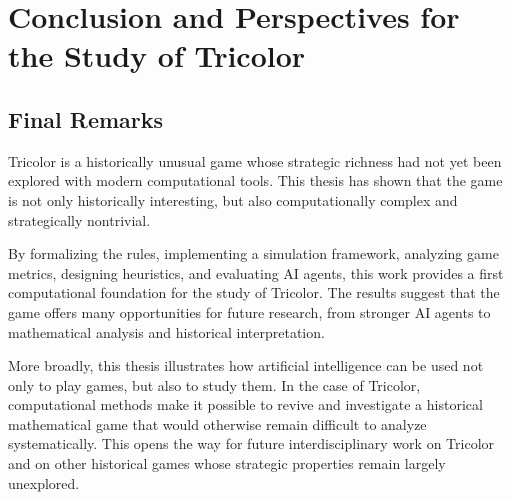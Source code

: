 \chapter{Conclusion and Perspectives for the Study of Tricolor}
\label{conclusion}

\section{Final Remarks}

Tricolor is a historically unusual game whose strategic richness had not yet been explored with modern computational tools. This thesis has shown that the game is not only historically interesting, but also computationally complex and strategically nontrivial.

By formalizing the rules, implementing a simulation framework, analyzing game metrics, designing heuristics, and evaluating AI agents, this work provides a first computational foundation for the study of Tricolor. The results suggest that the game offers many opportunities for future research, from stronger AI agents to mathematical analysis and historical interpretation.

More broadly, this thesis illustrates how artificial intelligence can be used not only to play games, but also to study them. In the case of Tricolor, computational methods make it possible to revive and investigate a historical mathematical game that would otherwise remain difficult to analyze systematically. This opens the way for future interdisciplinary work on Tricolor and on other historical games whose strategic properties remain largely unexplored.
